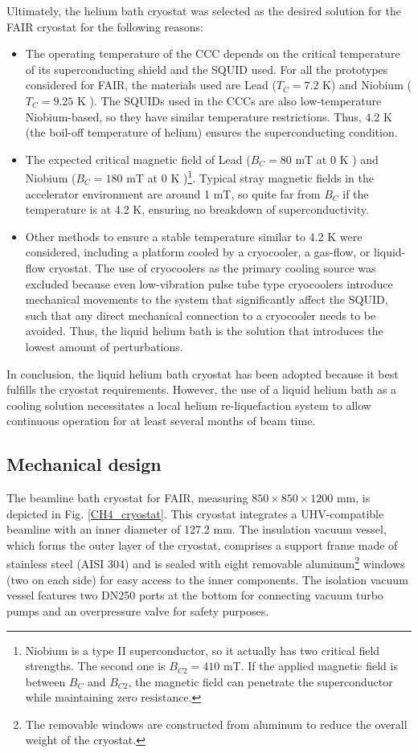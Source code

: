 \documentclass[12pt,a4paper]{report}
\begin{document}
       Ultimately, the helium bath cryostat was selected as the desired solution for the FAIR cryostat for the following reasons:
       \begin{itemize}
       	\item The operating temperature of the CCC depends on the critical temperature of its superconducting shield and the SQUID used. For all the prototypes considered for FAIR, the materials used are Lead ($T_C = 7.2$ K) and Niobium ($T_C=9.25$ K \cite{Squid_handbook_1}). The SQUIDs used in the CCCs are also low-temperature Niobium-based, so they have similar temperature restrictions. Thus, 4.2 K (the boil-off temperature of helium) ensures the superconducting condition.
       	\item The expected critical magnetic field of Lead ($B_C = 80$ mT at 0 K \cite{Pb_Tc}) and Niobium ($B_C = 180$ mT at 0 K \cite{Nb_Tc})\footnote{Niobium is a type II superconductor, so it actually has two critical field strengths. The second one is $B_{C2} = 410$ mT. If the applied magnetic field is between $B_C$ and $B_{C2}$, the magnetic field can penetrate the superconductor while maintaining zero resistance.}. Typical stray magnetic fields in the accelerator environment are around 1 mT, so quite far from $B_C$ if the temperature is at 4.2 K, ensuring no breakdown of superconductivity.
       	\item Other methods to ensure a stable temperature similar to 4.2 K were considered, including a platform cooled by a cryocooler, a gas-flow, or liquid-flow cryostat. The use of cryocoolers as the primary cooling source was excluded because even low-vibration pulse tube type cryocoolers introduce mechanical movements to the system that significantly affect the SQUID, such that any direct mechanical connection to a cryocooler needs to be avoided. Thus, the liquid helium bath is the solution that introduces the lowest amount of perturbations.
       \end{itemize}
       
       In conclusion, the liquid helium bath cryostat has been adopted \cite{Ekin} because it best fulfills the cryostat requirements. However, the use of a liquid helium bath as a cooling solution necessitates a local helium re-liquefaction system to allow continuous operation for at least several months of beam time.
       
       \subsection{Mechanical design}
       The beamline bath cryostat for FAIR, measuring \(850 \times 850 \times 1200\) mm, is depicted in Fig. \ref{CH4_cryostat}. This cryostat integrates a UHV-compatible beamline with an inner diameter of 127.2 mm. The insulation vacuum vessel, which forms the outer layer of the cryostat, comprises a support frame made of stainless steel (AISI 304) and is sealed with eight removable aluminum\footnote{The removable windows are constructed from aluminum to reduce the overall weight of the cryostat.} windows (two on each side) for easy access to the inner components. The isolation vacuum vessel features two DN250 ports at the bottom for connecting vacuum turbo pumps and an overpressure valve for safety purposes.
       
\end{document}
